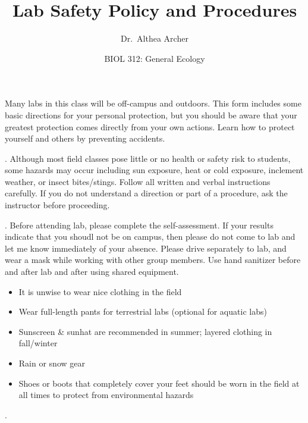 \documentclass{tufte-handout}
\title{Lab Safety Policy and Procedures}										%
\author{Dr.\ Althea Archer}										%
\date{BIOL 312: General Ecology}
\begin{document}
\maketitle


\begin{fullwidth}

Many labs in this class will be off-campus and outdoors. This form includes some basic directions for your personal protection, but you should be aware that your greatest protection comes directly from your own actions. Learn how to protect yourself and others by preventing accidents. 

. Although most field classes pose little or no health or safety risk to students, some hazards may occur including sun exposure, heat or cold exposure, inclement weather, or insect bites/stings. Follow all written and verbal instructions carefully. If you do not understand a direction or part of a procedure, ask the instructor before proceeding.

. Before attending lab, please complete the self-assessment. If your results indicate that you shoudl not be on campus, then please do not come to lab and let me know immediately of your absence. Please drive separately to lab, and wear a mask while working with other group members. Use hand sanitizer before and after lab and after using shared equipment.


\begin{itemize}
\item It is unwise to wear nice clothing in the field
\item Wear full-length pants for terrestrial labs (optional for aquatic labs)
\item Sunscreen \& sunhat are recommended in summer; layered clothing in fall/winter
\item Rain or snow gear
\item Shoes or boots that completely cover your feet should be worn in the field at all times to protect from environmental hazards
\end{itemize}

. 


\end{fullwidth}
\end{document}
